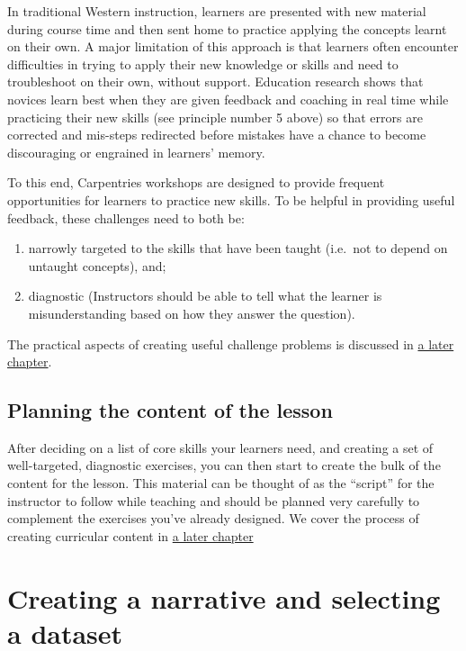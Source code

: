 \documentclass[]{book}
\providecommand{\tightlist}{%
  \setlength{\itemsep}{0pt}\setlength{\parskip}{0pt}}
\begin{document}
In traditional Western instruction, learners are presented with new material during course time
and then sent home to practice applying the concepts learnt on their own. A major limitation of this
approach is that learners often encounter difficulties in trying to apply their new knowledge or skills
and need to troubleshoot on their own, without support. Education research shows that novices learn best when
they are given feedback and coaching in real time while practicing their new skills (see principle
number 5 above) so that errors are corrected and mis-steps redirected before mistakes have a chance to become
discouraging or engrained in learners' memory.

To this end, Carpentries workshops are designed to provide frequent opportunities for learners to practice new skills. To be
helpful in providing useful feedback, these challenges need to both be:

\begin{enumerate}
\def\labelenumi{\arabic{enumi}.}
\tightlist
\item
  narrowly targeted to the skills that have been taught (i.e.~not to depend
  on untaught concepts), and;
\item
  diagnostic (Instructors should be able to tell what the learner is
  misunderstanding based on how they answer the question).
\end{enumerate}

The practical aspects of creating useful challenge problems is discussed in \protect\hyperlink{designing-challenges-1}{a
later chapter}.

\hypertarget{planning-the-content-of-the-lesson}{%
\subsection{Planning the content of the lesson}\label{planning-the-content-of-the-lesson}}

After deciding on a list of core skills your learners need, and
creating a set of well-targeted, diagnostic exercises, you can
then start to create the bulk of the content for the lesson.
This material can be thought of as the ``script'' for the
instructor to follow while teaching and should be planned
very carefully to complement the exercises you've already
designed. We cover the process of creating curricular content
in \protect\hyperlink{developing-content}{a later chapter}

\hypertarget{creating-a-narrative-and-selecting-a-dataset}{%
\section{Creating a narrative and selecting a dataset}\label{creating-a-narrative-and-selecting-a-dataset}}
\end{document}
